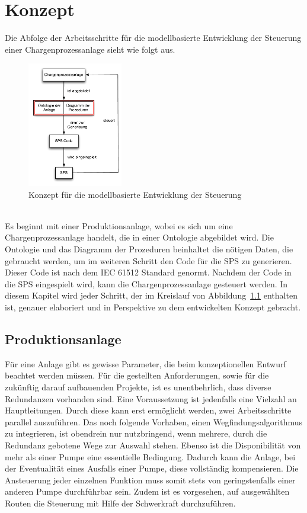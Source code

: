 
\chapter{Konzept} \label{chapter:architecture}
Die Abfolge der Arbeitsschritte für die modellbasierte Entwicklung der Steuerung einer Chargenprozessanlage sieht wie folgt aus.
\begin{figure}[h!]
		\centering
		\includegraphics[width=0.37\textwidth]{graphics/konzept/konzept_new.pdf}
		\caption{Konzept für die modellbasierte Entwicklung der Steuerung}
		\label{fig:konz_konzept_new}
\end{figure} \\

Es beginnt mit einer Produktionsanlage, wobei es sich um eine Chargenprozessanlage handelt, die in einer Ontologie abgebildet wird. Die Ontologie und das Diagramm der Prozeduren beinhaltet die nötigen Daten, die gebraucht werden, um im weiteren Schritt den Code für die SPS zu generieren. Dieser Code ist nach dem IEC 61512 Standard genormt. Nachdem der Code in die SPS eingespielt wird, kann die Chargenprozessanlage gesteuert werden. 
In diesem Kapitel wird jeder Schritt, der im Kreislauf von Abbildung~\ref{fig:konz_konzept_new} enthalten ist, genauer elaboriert und in Perspektive zu dem entwickelten Konzept gebracht.
\section{Produktionsanlage}
Für eine Anlage gibt es gewisse Parameter, die beim konzeptionellen Entwurf beachtet werden müssen. Für die gestellten Anforderungen, sowie für die zukünftig darauf aufbauenden Projekte, ist es unentbehrlich, dass diverse Redundanzen vorhanden sind. Eine Voraussetzung ist jedenfalls eine Vielzahl an Hauptleitungen. Durch diese kann erst ermöglicht werden, zwei Arbeitsschritte parallel auszuführen. Das noch folgende Vorhaben, einen Wegfindungsalgorithmus zu integrieren, ist obendrein nur nutzbringend, wenn mehrere, durch die Redundanz gebotene Wege zur Auswahl stehen. Ebenso ist die Disponibilität von mehr als einer Pumpe eine essentielle Bedingung. Dadurch kann die Anlage, bei der Eventualität eines Ausfalls einer Pumpe, diese vollständig kompensieren. Die Ansteuerung jeder einzelnen Funktion muss somit stets von geringstenfalls einer anderen Pumpe durchführbar sein. Zudem ist es vorgesehen, auf ausgewählten Routen die Steuerung mit Hilfe der Schwerkraft durchzuführen.\\

